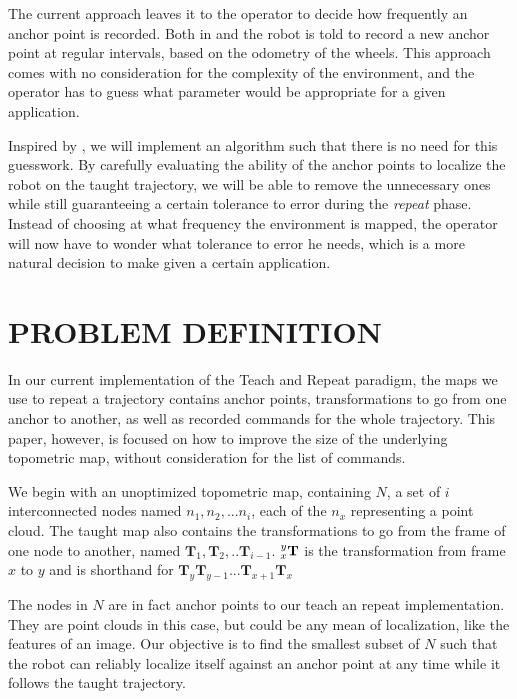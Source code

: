 \documentclass[letterpaper,10 pt,conference]{ieeeconf}
\newcommand{\mat}[1]{\mathbf{#1}}
\begin{document}
The current approach leaves it to the operator to decide how frequently an anchor point is
recorded. Both in \cite{Furgale10} and \cite{Sprunk13} the robot is told to record a new anchor
point at regular intervals, based on the odometry of the wheels. This approach comes with no
consideration for the complexity of the environment, and the operator has to guess what parameter
would be appropriate for a given application.

Inspired by \cite{Churchill15}, we will implement an algorithm such that there is no need for this
guesswork. By carefully evaluating the ability of the anchor points to localize the robot on the taught
trajectory, we will be able to remove the unnecessary ones while still guaranteeing a certain
tolerance to error during the \textit{repeat} phase. Instead of choosing at what frequency the
environment is mapped, the operator will now have to wonder what tolerance to error he needs, which
is a more natural decision to make given a certain application.


\section{PROBLEM DEFINITION}

In our current implementation of the Teach and Repeat paradigm, the maps we use to repeat a
trajectory contains anchor points, transformations to go from one anchor to another, as well as
recorded commands for the whole trajectory. This paper, however, is focused on how to improve the
size of the underlying topometric map, without consideration for the list of commands.

We begin with an unoptimized topometric map, containing $N$, a set of $i$
interconnected nodes named $n_1, n_2, ... n_{i}$, each of the $n_x$ representing
a point cloud. The taught map also contains the transformations to go from the
frame of one node to another, named $\mat{T}_1, \mat{T}_2,..
\mat{T}_{i-1}$.
$\prescript{y}{x}{\mat{T}}$ is the transformation from frame $x$ to $y$ and is
shorthand for $\mat{T}_y \mat{T}_{y-1}...\mat{T}_{x+1} \mat{T}_x$ 

The nodes in $N$ are in fact anchor points to our teach an
repeat implementation. They are point clouds in this case, but could be any mean
of localization, like the features of an image. Our objective is to find the
smallest subset of $N$ such that the robot can reliably localize itself against
an anchor point at any time while it follows the taught trajectory.
\end{document}
